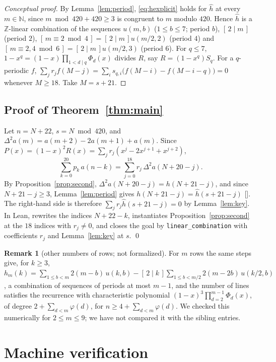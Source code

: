 \documentclass[11pt]{amsart}
\theoremstyle{plain}
\theoremstyle{definition}
\newtheorem{remark}[theorem]{Remark}
\newcommand{\N}{\mathbb{N}}
\newcommand{\Z}{\mathbb{Z}}
\newcommand{\ind}[1]{[\,#1\,]}
\begin{document}
\begin{proof}[Conceptual proof]
By Lemma~\ref{lem:period}, \eqref{eq:hexplicit} holds for $\hat h$ at every $m\in\N$, since $m\bmod420+420\ge3$ is congruent to $m$ modulo $420$. Hence $\hat h$ is a $\Z$-linear combination of the sequences $u(m,b)$ ($1\le b\le7$; period $b$), $\ind{2\mid m}$ (period $2$), $\ind{m\equiv2\bmod4}=\ind{2\mid m}u(m/2,2)$ (period $4$) and $\ind{m\equiv2,4\bmod6}=\ind{2\mid m}u(m/2,3)$ (period $6$). For $q\le7$, $1-x^q=(1-x)\prod_{1<d\mid q}\Phi_d(x)$ divides $R$, say $R=(1-x^q)S_q$. For a $q$-periodic $f$, $\sum_jr_jf(M-j)=\sum_i s_{q,i}\bigl(f(M-i)-f(M-i-q)\bigr)=0$ whenever $M\ge18$. Take $M=s+21$.
\end{proof}

\subsection{Proof of Theorem~\ref{thm:main}}
Let $n=N+22$, $s=N\bmod420$, and $\Delta^2a(m)=a(m+2)-2a(m+1)+a(m)$. Since $P(x)=(1-x)^2R(x)=\sum_jr_j(x^j-2x^{j+1}+x^{j+2})$,
\[
\sum_{k=0}^{20}p_k\,a(n-k)=\sum_{j=0}^{18}r_j\,\Delta^2a(N+20-j).
\]
By Proposition~\ref{prop:second}, $\Delta^2a(N+20-j)=h(N+21-j)$, and since $N+21-j\ge3$, Lemma~\ref{lem:period} gives $h(N+21-j)=\hat h(s+21-j)$ []. The right-hand side is therefore $\sum_jr_j\hat h(s+21-j)=0$ by Lemma~\ref{lem:key}. In Lean,  rewrites the indices $N+22-k$, instantiates Proposition~\ref{prop:second} at the $18$ indices with $r_j\ne0$, and closes the goal by \texttt{linear\_combination} with coefficients $r_j$ and Lemma~\ref{lem:key} at $s$. \qed

\begin{remark}[other numbers of rows; not formalized]
For $m$ rows the same steps give, for $k\ge3$, $h_m(k)=\sum_{1\le b<m}2(m-b)\,u(k,b)-\ind{2\mid k}\sum_{1\le b<m/2}2(m-2b)\,u(k/2,b)$, a combination of sequences of periods at most $m-1$, and the number of lines satisfies the recurrence with characteristic polynomial $(1-x)^3\prod_{d=2}^{m-1}\Phi_d(x)$, of degree $2+\sum_{d<m}\varphi(d)$, for $n\ge4+\sum_{d<m}\varphi(d)$. We checked this numerically for $2\le m\le9$; we have not compared it with the sibling entries.
\end{remark}

\section{Machine verification}\label{sec:lean}
\end{document}
